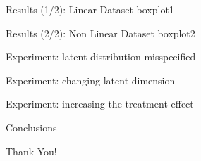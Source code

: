\documentclass[10pt]{beamer}
\begin{document}
\begin{frame}{Results (1/2): Linear Dataset}
    boxplot1
\end{frame}

\begin{frame}{Results (2/2): Non Linear Dataset}
    boxplot2
\end{frame}

\begin{frame}{Experiment: latent distribution misspecified}
    
\end{frame}

\begin{frame}{Experiment: changing latent dimension}
    
\end{frame}

\begin{frame}{Experiment: increasing the treatment effect}
    
\end{frame}

\begin{frame}{Conclusions}

\end{frame}

{
\begin{frame}[standout]
\thispagestyle{empty}
  {\LARGE Thank You!}
\end{frame}
}
\end{document}

